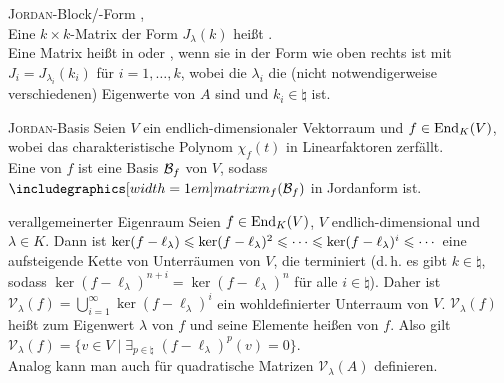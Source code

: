 \begin{Def}{\textsc{Jordan}-Block/-Form}
    ,
    \qquad
     \\
    Eine $k \times k$-Matrix der Form $J_\lambda(k)$
    heißt . \\
    Eine Matrix heißt in
     oder
    , wenn sie in der Form
    wie oben rechts ist mit $J_i = J_{\lambda_i}(k_i)$ für $i = 1, \dotsc, k$,
    wobei die $\lambda_i$ die (nicht notwendigerweise verschiedenen) Eigenwerte
    von $A$ sind und $k_i \in \natural$ ist.
\end{Def}

\begin{Def}{\textsc{Jordan}-Basis}
    Seien $V$ ein endlich-dimensionaler Vektorraum und $f \in \operatorname{End}_K(V)$,
    wobei das charakteristische Polynom $\chi_f(t)$ in Linearfaktoren
    zerfällt. \\
    Eine  von $f$ ist eine Basis
    $\mathcal{B}_f$ von $V$, sodass $\matrixm_f(\basis{B}_f)$ in Jordanform
    ist.
\end{Def}

\begin{Def}{verallgemeinerter Eigenraum}
    Seien $f \in \operatorname{End}_K(V)$, $V$ endlich-dimensional und $\lambda \in K$.
    Dann ist $\ker(f - \ell_\lambda) \leqslant \ker(f - \ell_\lambda)^2 \leqslant \dotsb
    \leqslant \ker(f - \ell_\lambda)^i \leqslant \dotsb$ eine aufsteigende Kette
    von Unterräumen von $V$, die terminiert
    (d.\,h. es gibt $k \in \natural$, sodass
    $\ker(f - \ell_\lambda)^{n+i} = \ker(f - \ell_\lambda)^n$ für alle
    $i \in \natural$).
    Daher ist $\mathcal{V}_\lambda(f) = \bigcup_{i=1}^\infty
    \ker(f - \ell_\lambda)^i$ ein wohldefinierter Unterraum von $V$.
    $\mathcal{V}_\lambda(f)$ heißt 
    zum Eigenwert $\lambda$ von $f$ und seine Elemente heißen
     von $f$.
    Also gilt $\mathcal{V}_\lambda(f) = \{v \in V \;|\;
    \exists_{p \in \natural}\; (f - \ell_\lambda)^p(v) = 0\}$. \\
    Analog kann man auch für quadratische Matrizen $\mathcal{V}_\lambda(A)$
    definieren.
\end{Def}

